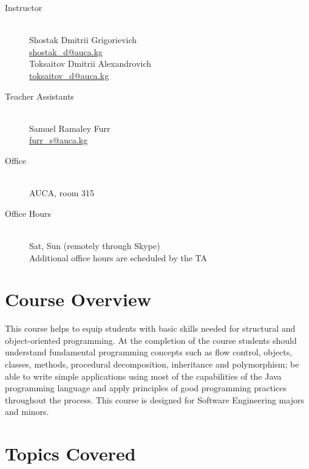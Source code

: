 \documentclass[12pt,a4paper,oneside]{article}
\begin{document}
        \begin{description}
            \item[Instructor]\hfill\\
                Shostak Dmitrii Grigorievich\\
                \href{mailto:shostak_d@auca.kg}{shostak\_d@auca.kg}\\
                Toksaitov Dmitrii Alexandrovich\\
                \href{mailto:toksaitov_d@auca.kg}{toksaitov\_d@auca.kg}
            \item[Teacher Assistants]\hfill\\
                Samuel Ramaley Furr\\
                \href{mailto:furr_s@auca.kg}{furr\_s@auca.kg}
            \item[Office]\hfill\\
                AUCA, room 315
            \item[Office Hours]\hfill\\
                Sat, Sun (remotely through Skype)\\
                Additional office hours are scheduled by the TA
        \end{description}

    \section{Course Overview}

        This course helps to equip students with basic skills needed for
        structural and object-oriented programming. At the completion of the
        course students should understand fundamental programming concepts such
        as flow control, objects, classes, methods, procedural decomposition,
        inheritance and polymorphism; be able to write simple applications using
        most of the capabilities of the Java programming language and apply
        principles of good programming practices throughout the process.  This
        course is designed for Software Engineering majors and minors.

    \section{Topics Covered}
\end{document}
